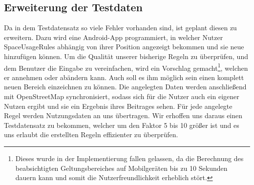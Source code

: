 \subsection{Erweiterung der Testdaten}
Da in dem Testdatensatz so viele Fehler vorhanden sind, ist geplant diesen zu erweitern. Dazu wird eine Android-App programmiert, in welcher Nutzer SpaceUsageRules
abhängig von ihrer Position angezeigt bekommen und sie neue hinzufügen können.
Um die Qualität unserer bisherige Regeln zu überprüfen, und dem Benutzer die Eingabe zu vereinfachen, wird ein Vorschlag gemacht\footnote{Dieses wurde in der Implementierung fallen gelassen,
da die Berechnung des beabsichtigten Geltungsbereiches auf Mobilgeräten bis zu 10 Sekunden dauern kann und somit die Nutzerfreundlichkeit erheblich stört.},
welchen er annehmen oder abändern kann.
Auch soll es ihm möglich sein einen komplett neuen Bereich einzeichnen zu können.
Die angelegten Daten werden anschließend mit OpenStreetMap synchronisiert, sodass sich für die Nutzer auch ein eigener Nutzen ergibt
und sie ein Ergebnis ihres Beitrages sehen.
Für jede angelegte Regel werden Nutzungsdaten an uns übertragen.
Wir erhoffen uns daraus einen Testdatensatz zu bekommen, welcher um den Faktor 5 bis 10 größer ist und es uns erlaubt die erstellten Regeln effizienter zu überprüfen.
